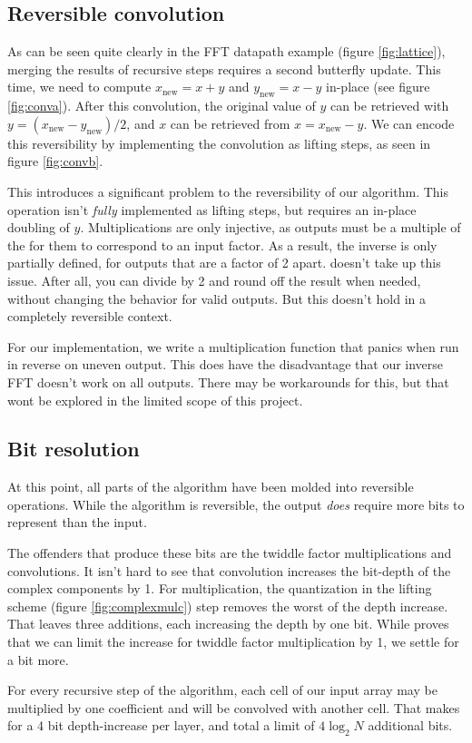 

\subsection{Reversible convolution}
As can be seen quite clearly in the FFT datapath example (figure \ref{fig:lattice}),
merging the results of recursive steps requires a second butterfly update.
This time, we need to compute
$x_\text{new} = x + y$ and $y_\text{new} = x - y$ in-place (see figure \ref{fig:conva}).
After this convolution, the original value of $y$ can be retrieved with
$y = (x_\text{new} - y_\text{new})/2$, and $x$ can be retrieved from $x = x_\text{new} - y$.
We can encode this reversibility by implementing the convolution as lifting steps,
as seen in figure \ref{fig:convb}.



This introduces a significant problem to the reversibility of our algorithm.
This operation isn't \textit{fully} implemented as lifting steps,
but requires an in-place doubling of $y$.
Multiplications are only injective,
as outputs must be a multiple of the for them to correspond to an input factor.
As a result, the inverse is only partially defined, for outputs that are a factor of 2 apart.
\cite{intfft} doesn't take up this issue.
After all, you can divide by 2 and round off the result when needed,
without changing the behavior for valid outputs.
But this doesn't hold in a completely reversible context.

For our implementation,
we write a multiplication function that panics when run in reverse on uneven output.
This does have the disadvantage that our inverse FFT doesn't work on all outputs.
There may be workarounds for this,
but that wont be explored in the limited scope of this project.

\subsection{Bit resolution}
At this point,
all parts of the algorithm have been molded into reversible operations.
While the algorithm is reversible,
the output \textit{does} require more bits to represent than the input.

The offenders that produce these bits are the twiddle factor multiplications and convolutions.
It isn't hard to see that convolution increases the bit-depth of the complex components by 1.
For multiplication, the quantization in the lifting scheme (figure \ref{fig:complexmulc})
step removes the worst of the depth increase.
That leaves three additions, each increasing the depth by one bit.
While \cite{intfft} proves
that we can limit the increase for twiddle factor multiplication by 1,
we settle for a bit more.

For every recursive step of the algorithm,
each cell of our input array may be multiplied by one coefficient
and will be convolved with another cell.
That makes for a 4 bit depth-increase per layer, and total a limit of $4 \log_2 N$ additional bits.
